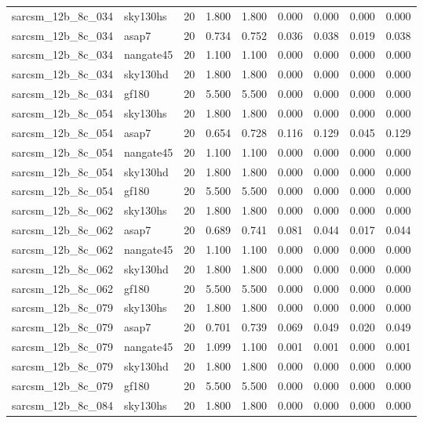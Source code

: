 \begin{tabular}{llrrrrrrr}
sarcsm\_12b\_8c\_034 & sky130hs & 20 & 1.800 & 1.800 & 0.000 & 0.000 & 0.000 & 0.000 \\
sarcsm\_12b\_8c\_034 & asap7 & 20 & 0.734 & 0.752 & 0.036 & 0.038 & 0.019 & 0.038 \\
sarcsm\_12b\_8c\_034 & nangate45 & 20 & 1.100 & 1.100 & 0.000 & 0.000 & 0.000 & 0.000 \\
sarcsm\_12b\_8c\_034 & sky130hd & 20 & 1.800 & 1.800 & 0.000 & 0.000 & 0.000 & 0.000 \\
sarcsm\_12b\_8c\_034 & gf180 & 20 & 5.500 & 5.500 & 0.000 & 0.000 & 0.000 & 0.000 \\
sarcsm\_12b\_8c\_054 & sky130hs & 20 & 1.800 & 1.800 & 0.000 & 0.000 & 0.000 & 0.000 \\
sarcsm\_12b\_8c\_054 & asap7 & 20 & 0.654 & 0.728 & 0.116 & 0.129 & 0.045 & 0.129 \\
sarcsm\_12b\_8c\_054 & nangate45 & 20 & 1.100 & 1.100 & 0.000 & 0.000 & 0.000 & 0.000 \\
sarcsm\_12b\_8c\_054 & sky130hd & 20 & 1.800 & 1.800 & 0.000 & 0.000 & 0.000 & 0.000 \\
sarcsm\_12b\_8c\_054 & gf180 & 20 & 5.500 & 5.500 & 0.000 & 0.000 & 0.000 & 0.000 \\
sarcsm\_12b\_8c\_062 & sky130hs & 20 & 1.800 & 1.800 & 0.000 & 0.000 & 0.000 & 0.000 \\
sarcsm\_12b\_8c\_062 & asap7 & 20 & 0.689 & 0.741 & 0.081 & 0.044 & 0.017 & 0.044 \\
sarcsm\_12b\_8c\_062 & nangate45 & 20 & 1.100 & 1.100 & 0.000 & 0.000 & 0.000 & 0.000 \\
sarcsm\_12b\_8c\_062 & sky130hd & 20 & 1.800 & 1.800 & 0.000 & 0.000 & 0.000 & 0.000 \\
sarcsm\_12b\_8c\_062 & gf180 & 20 & 5.500 & 5.500 & 0.000 & 0.000 & 0.000 & 0.000 \\
sarcsm\_12b\_8c\_079 & sky130hs & 20 & 1.800 & 1.800 & 0.000 & 0.000 & 0.000 & 0.000 \\
sarcsm\_12b\_8c\_079 & asap7 & 20 & 0.701 & 0.739 & 0.069 & 0.049 & 0.020 & 0.049 \\
sarcsm\_12b\_8c\_079 & nangate45 & 20 & 1.099 & 1.100 & 0.001 & 0.001 & 0.000 & 0.001 \\
sarcsm\_12b\_8c\_079 & sky130hd & 20 & 1.800 & 1.800 & 0.000 & 0.000 & 0.000 & 0.000 \\
sarcsm\_12b\_8c\_079 & gf180 & 20 & 5.500 & 5.500 & 0.000 & 0.000 & 0.000 & 0.000 \\
sarcsm\_12b\_8c\_084 & sky130hs & 20 & 1.800 & 1.800 & 0.000 & 0.000 & 0.000 & 0.000 \\

\end{tabular}
